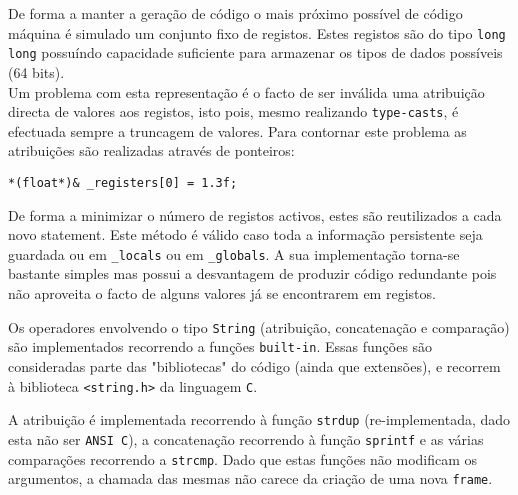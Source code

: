 \documentclass[a4paper]{article}
\begin{document}
\indent \indent De forma a manter a geração de código o mais próximo possível de código máquina é simulado um conjunto fixo de registos.
Estes registos são do tipo \texttt{long long} possuíndo capacidade suficiente para armazenar os tipos de dados possíveis (64 bits). \\
\indent Um problema com esta representação é o facto de ser inválida uma atribuição directa de valores aos registos, isto pois, mesmo realizando
\texttt{type-casts}, é efectuada sempre a truncagem de valores. Para contornar este problema as atribuições são realizadas através de ponteiros:

\begin{center}
	\verb!*(float*)& _registers[0] = 1.3f;!
\end{center}

\indent De forma a minimizar o número de registos activos, estes são reutilizados a cada novo statement.
Este método é válido caso toda a informação persistente seja guardada ou em \texttt{\_locals} ou em \texttt{\_globals}. A sua implementação torna-se bastante simples mas possui a desvantagem de produzir código redundante pois
não aproveita o facto de alguns valores já se encontrarem em registos.

\indent Os operadores envolvendo o tipo \texttt{String} (atribuição, concatenação e comparação) são implementados recorrendo a funções \texttt{built-in}. Essas
funções são consideradas parte das "bibliotecas" do código (ainda que extensões), e recorrem à biblioteca \texttt{<string.h>} da linguagem \texttt{C}.

\indent A atribuição é implementada recorrendo à função \texttt{strdup} (re-implementada, dado esta não ser \texttt{ANSI C}), a concatenação recorrendo à função
\texttt{sprintf} e as várias comparações recorrendo a \texttt{strcmp}. Dado que estas funções não modificam os argumentos, a chamada das mesmas não carece
da criação de uma nova \texttt{frame}.

\cleardoublepage
\end{document}
